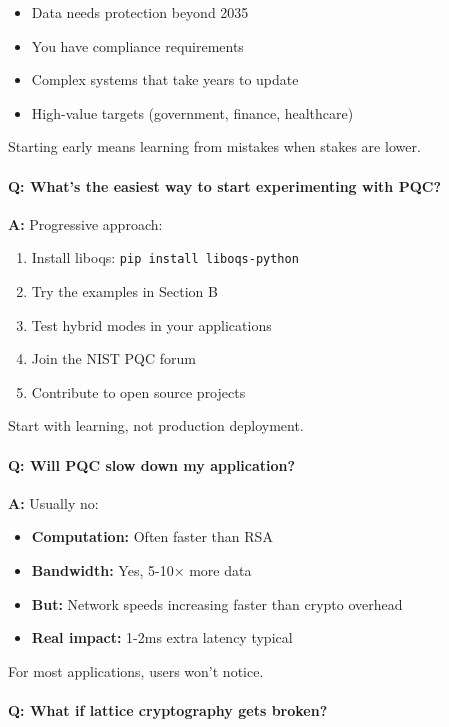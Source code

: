 \documentclass[11pt,a4paper]{article}
\begin{document}
\begin{itemize}
    \item Data needs protection beyond 2035
    \item You have compliance requirements
    \item Complex systems that take years to update
    \item High-value targets (government, finance, healthcare)
\end{itemize}

Starting early means learning from mistakes when stakes are lower.

\paragraph{Q: What's the easiest way to start experimenting with PQC?}

\textbf{A:} Progressive approach:

\begin{enumerate}
    \item Install liboqs: \texttt{pip install liboqs-python}
    \item Try the examples in Section B
    \item Test hybrid modes in your applications
    \item Join the NIST PQC forum
    \item Contribute to open source projects
\end{enumerate}

Start with learning, not production deployment.

\paragraph{Q: Will PQC slow down my application?}

\textbf{A:} Usually no:

\begin{itemize}
    \item \textbf{Computation:} Often faster than RSA
    \item \textbf{Bandwidth:} Yes, 5-10× more data
    \item \textbf{But:} Network speeds increasing faster than crypto overhead
    \item \textbf{Real impact:} 1-2ms extra latency typical
\end{itemize}

For most applications, users won't notice.

\paragraph{Q: What if lattice cryptography gets broken?}
\end{document}
